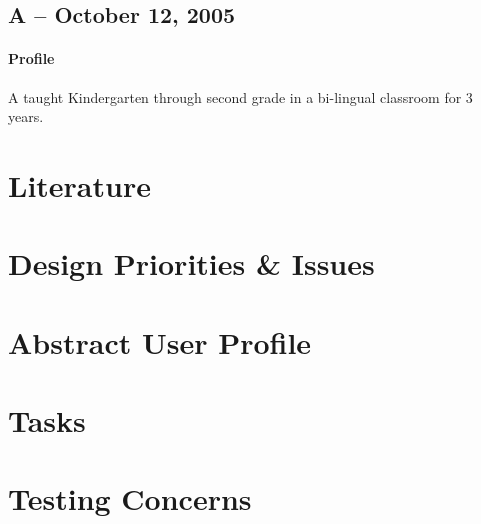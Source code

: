 \documentclass[12pt,titlepage]{article}
\begin{document}
\subsection{A -- October 12, 2005}
\paragraph{Profile} A taught Kindergarten through second grade in a bi-lingual
classroom for 3 years.

\section{Literature}

\section{Design Priorities \& Issues}

\section{Abstract User Profile}

\section{Tasks}

\section{Testing Concerns}
\end{document}
